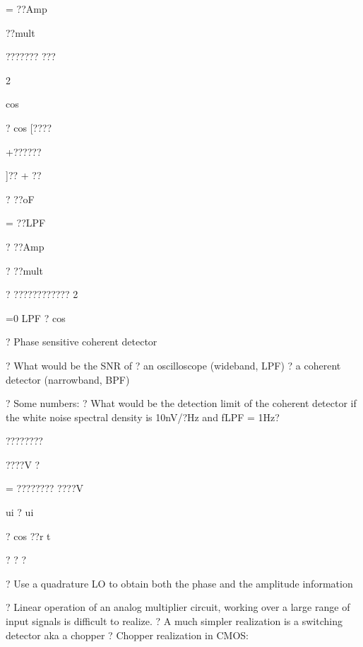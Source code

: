 \documentclass[2pt,landscape]{article}
\begin{document}
\begin{multicols*}{5}
= ??Amp


??mult


??????? ???


2


cos


?  cos 
[????


+??????


]?? + ??



?	??oF




= ??LPF




? ??Amp




? ??mult



? ????????????
2


=0	LPF
? cos


?	Phase sensitive coherent detector



?	What would be the SNR of
?	an oscilloscope (wideband, LPF)
?	a coherent detector (narrowband, BPF)


?	Some numbers:
?	What would be the 
detection limit of the 
coherent detector if 
the white noise 
spectral density
is 10nV/?Hz and
fLPF = 1Hz?







????????


????V
?



= ???????? ????V














ui   ? u\textbullet i


? cos ??r t


? ? ?






?	Use a quadrature LO to obtain both the phase and the amplitude 
information










?	Linear operation of an analog multiplier circuit, working over a large
range of input signals is difficult to realize.
?	A much simpler realization 
is a switching detector 
aka a chopper
?	Chopper realization
in CMOS:





\end{multicols*}
\end{document}
